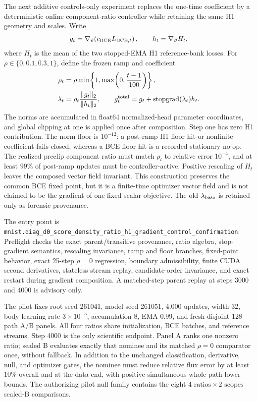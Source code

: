 \documentclass[11pt]{article}
\numberwithin{equation}{section}
\newcommand{\1}{\mathbf 1}
\begin{document}
The next additive controls-only experiment replaces the one-time coefficient
by a deterministic online component-ratio controller while retaining the same
H1 geometry and scales.  Write
\begin{equation}
  g_t=\nabla_\vartheta\!\left(c_{\rm BCE}L_{{\rm BCE},t}\right),
  \qquad
  h_t=\nabla_\vartheta H_t,
  \label{eq:h1-gradient-control-components}
\end{equation}
where \(H_t\) is the mean of the two stopped-EMA H1 reference-bank losses.
For \(\rho\in\{0,0.1,0.3,1\}\), define the frozen ramp and coefficient
\begin{align}
  \rho_t
  &=\rho\min\!\left\{1,\max\!\left(0,\frac{t-1}{100}\right)\right\},
  \label{eq:h1-gradient-control-ramp}\\
  \lambda_t
  &=\rho_t\frac{\lVert g_t\rVert_2}{\lVert h_t\rVert_2},
  \qquad
  g_t^{\rm total}
  =g_t+\operatorname{stopgrad}(\lambda_t)h_t.
  \label{eq:h1-gradient-control-vector-field}
\end{align}
The norms are accumulated in float64 normalized-head parameter coordinates,
and global clipping at one is applied once after composition.  Step one has
zero H1 contribution.  The norm floor is \(10^{-12}\): a post-ramp H1 floor
hit or nonfinite coefficient fails closed, whereas a BCE-floor hit is a
recorded stationary no-op.  The realized preclip component ratio must match
\(\rho_t\) to relative error \(10^{-4}\), and at least \(99\%\) of post-ramp
updates must be controller-active.  Positive rescaling of \(H_t\) leaves the
composed vector field invariant.  This construction preserves the common BCE
fixed point, but it is a finite-time optimizer vector field and is not claimed
to be the gradient of one fixed scalar objective.  The old
\(\lambda_{\rm base}\) is retained only as forensic provenance.

The entry point is
\nolinkurl{mnist.diag_d0_score_density_ratio_h1_gradient_control_confirmation}.
Preflight checks the exact parent/transitive provenance, ratio algebra,
stop-gradient semantics, rescaling invariance, ramp and floor branches,
fixed-point behavior, exact 25-step \(\rho=0\) regression, boundary
admissibility, finite CUDA second derivatives, stateless stream replay,
candidate-order invariance, and exact restart during gradient composition.
A matched-step parent replay at steps 3000 and 4000 is advisory only.

The pilot fixes root seed 261041, model seed 261051, 4,000 updates, width 32,
body learning rate \(3\mathbin{\times}10^{-5}\), accumulation 8, EMA 0.99,
and fresh disjoint 128-path A/B panels.  All four ratios share initialization,
BCE batches, and reference streams.  Step 4000 is the only scientific
endpoint.  Panel A ranks one nonzero ratio; sealed B evaluates exactly that
nominee and its matched \(\rho=0\) comparator once, without fallback.  In
addition to the unchanged classification, derivative, null, and optimizer
gates, the nominee must reduce relative flux error by at least \(10\%\)
overall and at the data end, with positive simultaneous whole-path lower
bounds.  The authorizing pilot null family contains the eight
\(4\text{ ratios}\mathbin{\times}2\text{ scopes}\) sealed-B comparisons.
\end{document}
